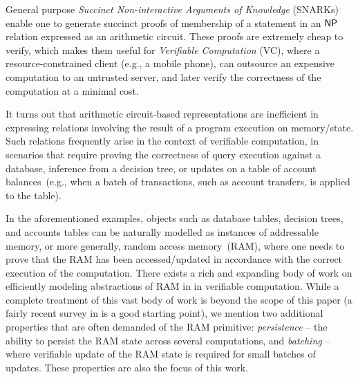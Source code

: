 General purpose {\em Succinct Non-interactive Arguments of Knowledge} (SNARKs) enable one to generate succinct
proofs of membership of a statement in an $\mathsf{NP}$ relation expressed as an arithmetic circuit. These proofs are
extremely cheap to verify, which makes them useful for {\em Verifiable Computation} (VC), where a resource-constrained
client (e.g., a mobile phone), can outsource an expensive computation to an untrusted server, and later
verify the correctness of the computation at a minimal cost.

\smallskip

 It turns out that arithmetic circuit-based representations are inefficient in expressing relations involving the result of a program execution on memory/state. Such relations frequently arise in the context of verifiable computation, in scenarios that require proving the correctness of query execution against a database, inference from a decision tree, or updates on a table of account balances~(e.g., when a batch of transactions, such as account transfers, is applied to the table).

In the aforementioned examples, objects such as database tables, decision trees, and accounts tables can be naturally
modelled as instances of addressable memory, or more generally, random access memory~(RAM), where one needs to prove that the RAM has been accessed/updated in accordance with the correct execution of the computation. There exists a rich and expanding body of work on efficiently modeling abstractions of RAM in in verifiable computation. While a complete treatment of this vast body of work is beyond
the scope of this paper (a fairly recent survey in \cite{WB15} is a good starting point), we mention two additional properties that are often demanded of the RAM primitive: {\em persistence} -- the ability to persist the RAM state across several computations, and {\em batching} --
where verifiable update of the RAM state is required for small batches of updates. These properties are also the focus of this work.


\smallskip

